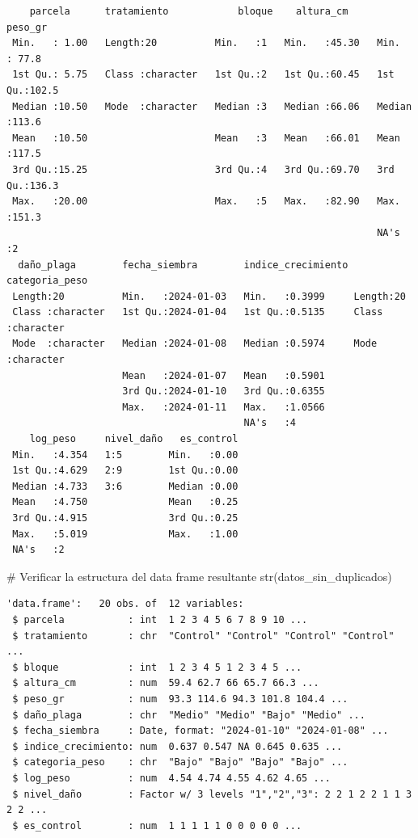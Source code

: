 \documentclass[
  spanish,
  a4paper,
  DIV=11,
  numbers=noendperiod,
  onepage,
  openany]{scrreprt}
\newenvironment{Shaded}{\begin{snugshade}}{\end{snugshade}}
\newcommand{\CommentTok}[1]{\textcolor[rgb]{0.37,0.37,0.37}{#1}}
\newcommand{\FunctionTok}[1]{\textcolor[rgb]{0.28,0.35,0.67}{#1}}
\newcommand{\NormalTok}[1]{\textcolor[rgb]{0.00,0.23,0.31}{#1}}
\begin{document}
\begin{verbatim}
    parcela      tratamiento            bloque    altura_cm        peso_gr     
 Min.   : 1.00   Length:20          Min.   :1   Min.   :45.30   Min.   : 77.8  
 1st Qu.: 5.75   Class :character   1st Qu.:2   1st Qu.:60.45   1st Qu.:102.5  
 Median :10.50   Mode  :character   Median :3   Median :66.06   Median :113.6  
 Mean   :10.50                      Mean   :3   Mean   :66.01   Mean   :117.5  
 3rd Qu.:15.25                      3rd Qu.:4   3rd Qu.:69.70   3rd Qu.:136.3  
 Max.   :20.00                      Max.   :5   Max.   :82.90   Max.   :151.3  
                                                                NA's   :2      
  daño_plaga        fecha_siembra        indice_crecimiento categoria_peso    
 Length:20          Min.   :2024-01-03   Min.   :0.3999     Length:20         
 Class :character   1st Qu.:2024-01-04   1st Qu.:0.5135     Class :character  
 Mode  :character   Median :2024-01-08   Median :0.5974     Mode  :character  
                    Mean   :2024-01-07   Mean   :0.5901                       
                    3rd Qu.:2024-01-10   3rd Qu.:0.6355                       
                    Max.   :2024-01-11   Max.   :1.0566                       
                                         NA's   :4                            
    log_peso     nivel_daño   es_control  
 Min.   :4.354   1:5        Min.   :0.00  
 1st Qu.:4.629   2:9        1st Qu.:0.00  
 Median :4.733   3:6        Median :0.00  
 Mean   :4.750              Mean   :0.25  
 3rd Qu.:4.915              3rd Qu.:0.25  
 Max.   :5.019              Max.   :1.00  
 NA's   :2                                
\end{verbatim}

\begin{Shaded}
\begin{Highlighting}[]
\CommentTok{\# Verificar la estructura del data frame resultante}
\FunctionTok{str}\NormalTok{(datos\_sin\_duplicados)}
\end{Highlighting}
\end{Shaded}

\begin{verbatim}
'data.frame':   20 obs. of  12 variables:
 $ parcela           : int  1 2 3 4 5 6 7 8 9 10 ...
 $ tratamiento       : chr  "Control" "Control" "Control" "Control" ...
 $ bloque            : int  1 2 3 4 5 1 2 3 4 5 ...
 $ altura_cm         : num  59.4 62.7 66 65.7 66.3 ...
 $ peso_gr           : num  93.3 114.6 94.3 101.8 104.4 ...
 $ daño_plaga        : chr  "Medio" "Medio" "Bajo" "Medio" ...
 $ fecha_siembra     : Date, format: "2024-01-10" "2024-01-08" ...
 $ indice_crecimiento: num  0.637 0.547 NA 0.645 0.635 ...
 $ categoria_peso    : chr  "Bajo" "Bajo" "Bajo" "Bajo" ...
 $ log_peso          : num  4.54 4.74 4.55 4.62 4.65 ...
 $ nivel_daño        : Factor w/ 3 levels "1","2","3": 2 2 1 2 2 1 1 3 2 2 ...
 $ es_control        : num  1 1 1 1 1 0 0 0 0 0 ...
\end{verbatim}
\end{document}
